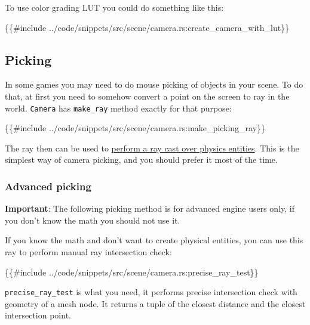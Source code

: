 \documentclass[
]{book}
\newenvironment{Shaded}{\begin{snugshade}}{\end{snugshade}}
\newcommand{\NormalTok}[1]{#1}
\theoremstyle{definition}
\theoremstyle{definition}
\theoremstyle{definition}
\theoremstyle{definition}
\theoremstyle{remark}
\begin{document}
To use color grading LUT you could do something like this:

\begin{Shaded}
\begin{Highlighting}[]
\NormalTok{\{\{\#include ../code/snippets/src/scene/camera.rs:create\_camera\_with\_lut\}\}}
\end{Highlighting}
\end{Shaded}

\subsection{Picking}\label{picking}

In some games you may need to do mouse picking of objects in your scene. To do that, at first you need to somehow convert a point on the screen to ray in the world. \texttt{Camera} has \texttt{make\_ray} method exactly for that purpose:

\begin{Shaded}
\begin{Highlighting}[]
\NormalTok{\{\{\#include ../code/snippets/src/scene/camera.rs:make\_picking\_ray\}\}}
\end{Highlighting}
\end{Shaded}

The ray then can be used to \href{../physics/ray.md}{perform a ray cast over physics entities}. This is the simplest way of camera picking, and you should prefer it most of the time.

\subsubsection{Advanced picking}\label{advanced-picking}

\textbf{Important}: The following picking method is for advanced engine users only, if you don't know the math you should not use it.

If you know the math and don't want to create physical entities, you can use this ray to perform manual ray intersection check:

\begin{Shaded}
\begin{Highlighting}[]
\NormalTok{\{\{\#include ../code/snippets/src/scene/camera.rs:precise\_ray\_test\}\}}
\end{Highlighting}
\end{Shaded}

\texttt{precise\_ray\_test} is what you need, it performs precise intersection check with geometry of a mesh node. It returns a tuple of the closest distance and the closest intersection point.
\end{document}
